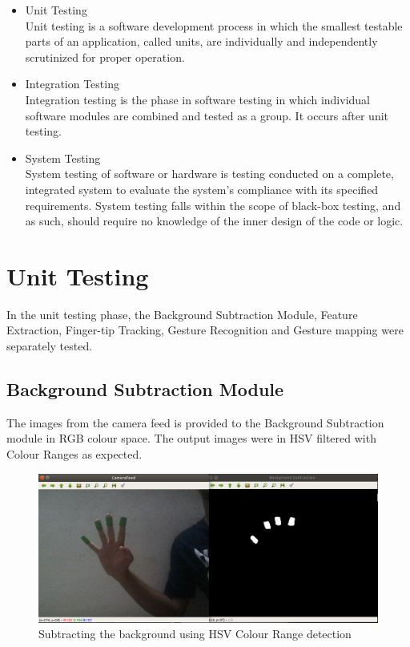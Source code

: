 \documentclass[11pt]{report}
\begin{document}
\begin{itemize}
    \item Unit Testing \\
Unit testing is a software development process in which the smallest testable parts of an
application, called units, are individually and independently scrutinized for proper operation.
    \item Integration Testing \\
    Integration testing is the phase in software testing in which individual software modules are
    combined and tested as a group. It occurs after unit testing.
    \item System Testing \\
    System testing of software or hardware is testing conducted on a complete, integrated system
    to evaluate the system’s compliance with its specified requirements. System testing falls
    within the scope of black-box testing, and as such, should require no knowledge of the inner
    design of the code or logic.
\end{itemize}
\section{Unit Testing}
In the unit testing phase, the Background Subtraction Module, Feature Extraction, Finger-tip Tracking, Gesture Recognition
and Gesture mapping were separately tested.

\subsection{Background Subtraction Module}

The images from the camera feed is provided to the Background Subtraction
module in RGB colour space. The output images were in HSV filtered with Colour Ranges as expected.

\begin{figure}[h]
    \includegraphics[width=15cm]{backgroundtesting.png}
    \caption{Subtracting the background using HSV Colour Range detection}
\end{figure}
\end{document}

